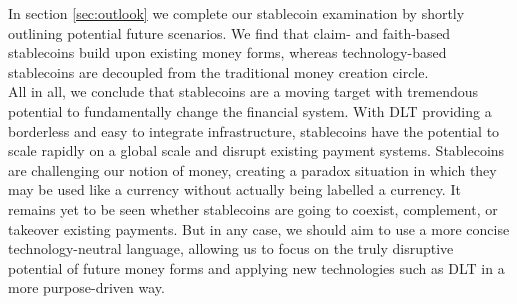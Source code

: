 \documentclass[conference]{IEEEtran}
\begin{document}
In section \ref{sec:outlook} we complete our stablecoin examination by shortly outlining potential future scenarios. We find that claim- and faith-based stablecoins build upon existing money forms, whereas technology-based stablecoins are decoupled from the traditional money creation circle.\\

All in all, we conclude that stablecoins are a moving target with tremendous potential to fundamentally change the financial system. With \ac{DLT} providing a borderless and easy to integrate infrastructure, stablecoins have the potential to scale rapidly on a global scale and disrupt existing payment systems. Stablecoins are challenging our notion of money, creating a paradox situation in which they may be used like a currency without actually being labelled a currency. It remains yet to be seen whether stablecoins are going to coexist, complement, or takeover existing payments. But in any case, we should aim to use a more concise technology-neutral language, allowing us to focus on the truly disruptive potential of future money forms and applying new technologies such as \ac{DLT} in a more purpose-driven way. 

  
\end{document}
